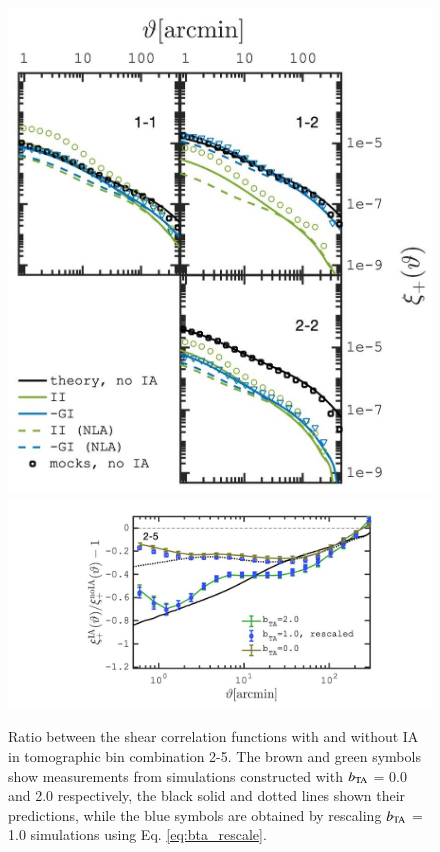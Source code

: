 \documentclass[useAMS,usenatbib]{mn2e}
\begin{document}
\begin{figure}
\includegraphics[width=\columnwidth]{graphs/xip_deltaNLA_bta1.jpg}
\includegraphics[width=\columnwidth]{graphs/frac_xip_bta1_rescaled}
\caption{Ratio between the shear correlation functions with and without IA in tomographic bin combination 2-5. The brown and green symbols show measurements from simulations constructed with $b_{\rm TA}$ = 0.0 and 2.0 respectively,  the black solid and dotted lines shown their predictions, while the blue symbols are obtained by rescaling $b_{\rm TA}$ = 1.0 simulations using Eq. \ref{eq:bta_rescale}.  }
\label{fig:xi_deltaNLA_rescaled}
\end{figure}
\end{document}
